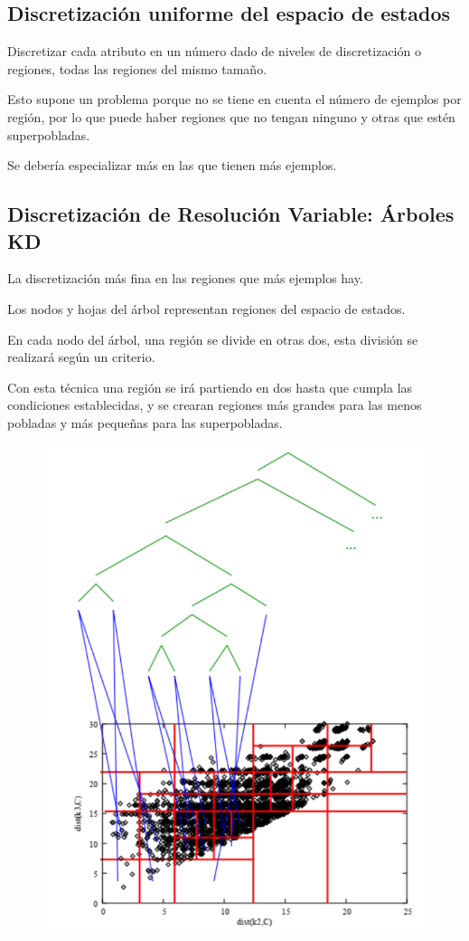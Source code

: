 \documentclass[12pt, twoside, openright]{report} %
\begin{document}
\subsection{Discretización uniforme del espacio de estados}
Discretizar cada atributo en un número dado de niveles de discretización o regiones, todas las regiones del mismo tamaño.

Esto supone un problema porque no se tiene en cuenta el número de ejemplos por región, por lo que puede haber regiones que no tengan ninguno y otras que estén superpobladas.

Se debería especializar más en las que tienen más ejemplos.

\subsection{Discretización de Resolución Variable: Árboles KD}
La discretización más fina en las regiones que más ejemplos hay.

Los nodos y hojas del árbol representan regiones del espacio de estados.

En cada nodo del árbol, una región se divide en otras dos, esta división se realizará según un criterio.

Con esta técnica una región se irá partiendo en dos hasta que cumpla las condiciones establecidas, y se crearan regiones más grandes para las menos pobladas y más pequeñas para las superpobladas.

\begin{figure}[H]
	{\includegraphics[scale=.25]{2021-04-24 14_09_21-refuerzo.pdf - Foxit Reader.png}}
\end{figure}
\end{document}
